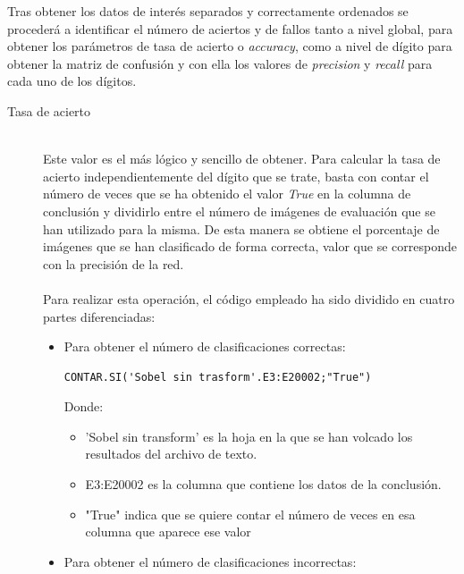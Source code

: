 Tras obtener los datos de interés separados y correctamente ordenados se procederá a identificar el número de aciertos y de fallos tanto a nivel global, para obtener los parámetros de tasa de acierto o \textit{accuracy}, como a nivel de dígito para obtener la matriz de confusión y con ella los valores de \textit{precision} y \textit{recall} para cada uno de los dígitos.\\

\begin{description}
	\item[Tasa de acierto] \hfill 
	\vspace{10pt}
	\\
	Este valor es el más lógico y sencillo de obtener. Para calcular la tasa de acierto independientemente del dígito que se trate, basta con contar el número de veces que se ha obtenido el valor \textit{True} en la columna de conclusión y dividirlo entre el número de imágenes de evaluación que se han utilizado para la misma. De esta manera se obtiene el porcentaje de imágenes que se han clasificado de forma correcta, valor que se corresponde con la precisión de la red.\\
	\vspace{-10pt}
	\\
	Para realizar esta operación, el código empleado ha sido dividido en cuatro partes diferenciadas:\\
	\vspace{-20pt}
	\begin{itemize}
		\item{Para obtener el número de clasificaciones correctas:
		\vspace{10pt}
		\begin{lstlisting}[frame=single]
			CONTAR.SI('Sobel sin trasform'.E3:E20002;"True")
		\end{lstlisting}
		Donde:
		\begin{itemize}
			\item 'Sobel sin transform' es la hoja en la que se han volcado los resultados del archivo de texto.
			\item E3:E20002 es la columna que contiene los datos de la conclusión.
			\item "True" indica que se quiere contar el número de veces en esa columna que aparece ese valor
		\end{itemize}
	}
	\item{Para obtener el número de clasificaciones incorrectas:
		\vspace{10pt}
		\begin{lstlisting}[frame=single]

\end{lstlisting}}
\end{itemize}
\end{description}
